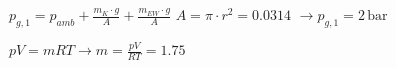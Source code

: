 \( p_{g,1} = p_{amb} + \frac{m_{K} \cdot g}{A} + \frac{m_{EW} \cdot g}{A} \)  
\( A = \pi \cdot r^2 = 0.0314 \)  
\( \rightarrow p_{g,1} = 2 \, \text{bar} \)  

\( pV = mRT \rightarrow m = \frac{pV}{RT} = 1.75 \)